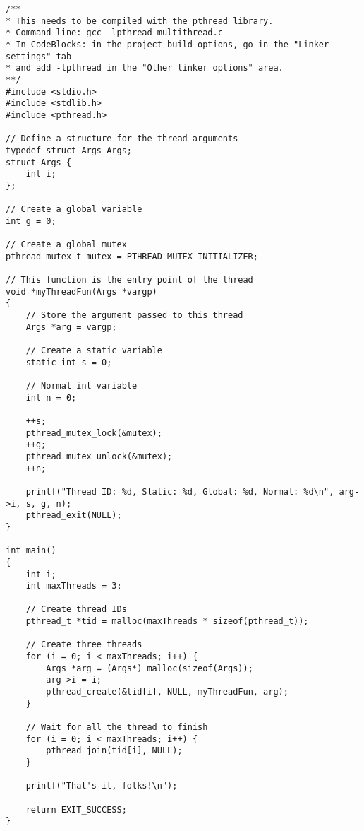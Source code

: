 \documentclass[10pt,a4paper]{article}
\theoremstyle{definition}%
\begin{document}
\begin{verbatim}
/**
* This needs to be compiled with the pthread library.
* Command line: gcc -lpthread multithread.c
* In CodeBlocks: in the project build options, go in the "Linker settings" tab 
* and add -lpthread in the "Other linker options" area.
**/
#include <stdio.h>
#include <stdlib.h>
#include <pthread.h>

// Define a structure for the thread arguments
typedef struct Args Args;
struct Args {
    int i;
};
 
// Create a global variable
int g = 0;

// Create a global mutex
pthread_mutex_t mutex = PTHREAD_MUTEX_INITIALIZER;
 
// This function is the entry point of the thread
void *myThreadFun(Args *vargp)
{
    // Store the argument passed to this thread
    Args *arg = vargp;
 
    // Create a static variable
    static int s = 0;

    // Normal int variable
    int n = 0;

    ++s;
    pthread_mutex_lock(&mutex);
    ++g;
    pthread_mutex_unlock(&mutex);
    ++n;
 
    printf("Thread ID: %d, Static: %d, Global: %d, Normal: %d\n", arg->i, s, g, n);
    pthread_exit(NULL);
}

int main()
{
    int i;
    int maxThreads = 3;

    // Create thread IDs
    pthread_t *tid = malloc(maxThreads * sizeof(pthread_t));
 
    // Create three threads
    for (i = 0; i < maxThreads; i++) {
        Args *arg = (Args*) malloc(sizeof(Args));
        arg->i = i;
        pthread_create(&tid[i], NULL, myThreadFun, arg);
    }

    // Wait for all the thread to finish
    for (i = 0; i < maxThreads; i++) {
        pthread_join(tid[i], NULL);
    }

    printf("That's it, folks!\n");
    
    return EXIT_SUCCESS;
}
\end{verbatim}
\end{document}
